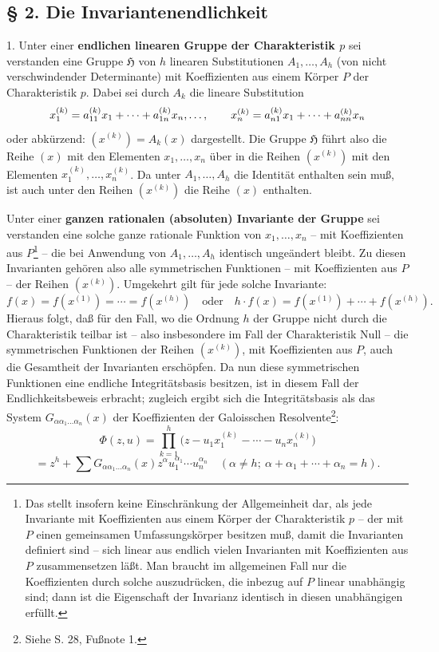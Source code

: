 \documentclass[11pt]{article}
\begin{document}
\subsection*{§ 2. Die Invariantenendlichkeit}

1. Unter einer \textbf{endlichen linearen Gruppe der Charakteristik $p$} sei verstanden eine Gruppe $\mathfrak H$ von $h$ linearen Substitutionen $A_1,\ldots,A_h$ (von nicht verschwindender Determinante) mit Koeffizienten aus einem Körper $P$ der Charakteristik $p$. Dabei sei durch $A_k$ die lineare Substitution
\[
 x_1^{(k)}=a_{11}^{(k)}x_1+\cdots+a_{1n}^{(k)}x_n,\\[-0.2em]
 \ldots,\qquad
 x_n^{(k)}=a_{n1}^{(k)}x_1+\cdots+a_{nn}^{(k)}x_n
\]
oder abkürzend: $(x^{(k)})=A_k(x)$ dargestellt. Die Gruppe $\mathfrak H$ führt also die Reihe $(x)$ mit den Elementen $x_1,\ldots,x_n$ über in die Reihen $(x^{(k)})$ mit den Elementen $x_1^{(k)},\ldots,x_n^{(k)}$. Da unter $A_1,\ldots,A_h$ die Identität enthalten sein muß, ist auch unter den Reihen $(x^{(k)})$ die Reihe $(x)$ enthalten.

Unter einer \textbf{ganzen rationalen (absoluten) Invariante der Gruppe} sei verstanden eine solche ganze rationale Funktion von $x_1,\ldots,x_n$ -- mit Koeffizienten aus $P$\footnote{Das stellt insofern keine Einschränkung der Allgemeinheit dar, als jede Invariante mit Koeffizienten aus einem Körper der Charakteristik $p$ -- der mit $P$ einen gemeinsamen Umfassungskörper besitzen muß, damit die Invarianten definiert sind -- sich linear aus endlich vielen Invarianten mit Koeffizienten aus $P$ zusammensetzen läßt. Man braucht im allgemeinen Fall nur die Koeffizienten durch solche auszudrücken, die inbezug auf $P$ linear unabhängig sind; dann ist die Eigenschaft der Invarianz identisch in diesen unabhängigen erfüllt.} -- die bei Anwendung von $A_1,\ldots,A_h$ identisch ungeändert bleibt. Zu diesen Invarianten gehören also alle symmetrischen Funktionen -- mit Koeffizienten aus $P$ -- der Reihen $(x^{(k)})$. Umgekehrt gilt für jede solche Invariante:
\[
 f(x)=f(x^{(1)})=\cdots=f(x^{(h)})
 \quad\text{oder}\quad
 h\cdot f(x)=f(x^{(1)})+\cdots+f(x^{(h)}).
\]
Hieraus folgt, daß für den Fall, wo die Ordnung $h$ der Gruppe nicht durch die Charakteristik teilbar ist -- also insbesondere im Fall der Charakteristik Null -- die symmetrischen Funktionen der Reihen $(x^{(k)})$, mit Koeffizienten aus $P$, auch die Gesamtheit der Invarianten erschöpfen. Da nun diese symmetrischen Funktionen eine endliche Integritätsbasis besitzen, ist in diesem Fall der Endlichkeitsbeweis erbracht; zugleich ergibt sich die Integritätsbasis als das System $G_{\alpha\alpha_1\ldots\alpha_n}(x)$ der Koeffizienten der Galoisschen Resolvente\footnote{Siehe S. 28, Fußnote 1.}:
\[
 \Phi(z,u)=\prod_{k=1}^{h}\bigl(z-u_1x_1^{(k)}-\cdots-u_nx_n^{(k)}\bigr)
\]
\[
 =z^h+\sum G_{\alpha\alpha_1\ldots\alpha_n}(x)
 z^{\alpha}u_1^{\alpha_1}\cdots u_n^{\alpha_n}
 \quad(\alpha\ne h;\ \alpha+\alpha_1+\cdots+\alpha_n=h).
\]
\end{document}
